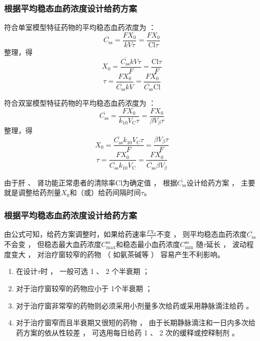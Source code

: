 \documentclass[dvipsnames, svgnames, x11names]{beamer}
\begin{document}
\begin{frame}
    \frametitle{根据平均稳态血药浓度设计给药方案}
    \begin{minipage}{0.48\linewidth}
        \vspace{-0.6em}
        符合单室模型特征药物的平均稳态血药浓度为 ：
        \[
            \overline{C_\mathrm{ss}} = \frac{FX_0}{kV\tau} = \frac{FX_0}{\mathrm{Cl}\tau}
        \]
        整理，得
        \[
            X_0 = \frac{\overline{C_\mathrm{ss}}kV\tau}{F} = \frac{\mathrm{Cl} \tau}{F}
        \]
        \[
            \tau = \frac{FX_0}{\overline{C_\mathrm{ss}}kV} = \frac{FX_0}{\overline{C_\mathrm{ss}}\mathrm{Cl}} 
        \]
        
    \end{minipage}\hfill
    \begin{minipage}{0.48\linewidth}
        符合双室模型特征药物的平均稳态血药浓度为 ：
        \[
            \overline{C_\mathrm{ss}} = \frac{FX_0}{k_{10}V_\mathrm{C}\tau} = \frac{FX_0}{\beta V_\beta \tau}
        \]
        整理，得
        \[
            X_0 = \frac{\overline{C_\mathrm{ss}}k_{10}V_\mathrm{C}\tau}{F} = \frac{\beta V_\beta \tau}{F}
        \]
        \[
            \tau = \frac{FX_0}{\overline{C_\mathrm{ss}}k_{10}V_\mathrm{C}} = \frac{FX_0}{\overline{C_\mathrm{ss}}\beta V_\beta} 
        \]
    \end{minipage}

    由于肝 、 肾功能正常患者的清除率Cl为确定值 ， 根据$\overline{C_\mathrm{ss}}$设计给药方案 ， 主要就是调整给药剂量$X_0$和（或）给药间隔时间$\tau$。
\end{frame}


\begin{frame}
    \frametitle{根据平均稳态血药浓度设计给药方案}
    由公式可知，给药方案调整时，如果给药速率$\frac{FX_0}{\tau}$不变 ， 则平均稳态血药浓度$\overline{C_\mathrm{ss}}$不会变 ， 但稳态最大血药浓度$C_{\max}^\mathrm{ss}$和稳态最小血药浓度$C_{\min}^\mathrm{ss}$ 随$\tau$延长 ， 波动程度变大 ， 对治疗窗较窄的药物 （ 如氨茶碱等 ） 容易产生不利影响。 
    \begin{enumerate}
      \item 在设计$\tau$时 ， 一般可选 1 、 2 个半衰期 ； 
      \item 对于治疗窗较窄的药物应小于 1个半衰期 ； 
      \item 对于治疗窗非常窄的药物则必须采用小剂量多次给药或采用静脉滴注给药 。
      \item 对于治疗窗窄而且半衰期又很短的药物 ， 由于长期静脉滴注和一日内多次给药方案的依从性较差 ， 可选用每日给药 1 、 2 次的缓释或控释制剂 。
    \end{enumerate}
\end{frame}
\end{document}

